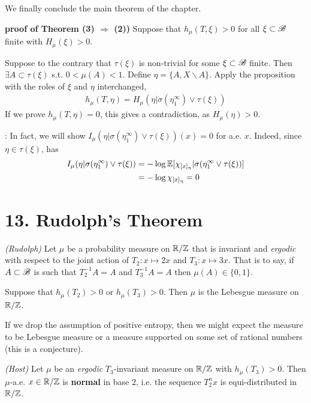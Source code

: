\documentclass[12pt,a4paper]{report}
\newenvironment{proof}
{\begin{changemargin}{1cm}{0.5cm} 
	}%
	{\end{changemargin}
}
\newenvironment{subproof}
{\begin{changemargin}{0.5cm}{0.5cm}
	}%
	{\end{changemargin}
}
\begin{document}
We finally conclude the main theorem of the chapter.
\s

\begin{proof}
\textbf{proof of Theorem (3) $\Rightarrow$ (2))} Suppose that $h_{\mu}(T, \xi ) >0$ for all $\xi \subset \mathscr{B}$ finite with $H_{\mu}(\xi) >0$. 

\quad Suppose to the contrary that $\tau(\xi)$ is non-trivial for some $\xi \subset \mathscr{B}$ finite. Then $\exists A \subset \tau(\xi)$ s.t. $0< \mu(A) <1$. Define $\eta = \{A, X\backslash A \}$. Apply the proposition with the roles of $\xi$ and $\eta$ interchanged,
\begin{align*}
h_{\mu}(T, \eta) = H_{\mu} (\eta | \sigma(\eta_1^{\infty}) \vee \tau(\xi) ) 
\end{align*}
If we prove $h_{\mu}(T, \eta) =0$, this gives a contradiction, as $H_{\mu}(\eta) >0$.
\begin{subproof}
: In fact, we will show $I_{\mu}(\eta | \sigma(\eta_1^{\infty}) \vee \tau(\xi)) (x) =0$ for a.e. $x$. Indeed, since $\eta \in \tau(\xi)$, has
\begin{align*}
I_{\mu}(\eta | \sigma(\eta_1^{\infty}) \vee \tau(\xi)) &= -\log \mathbb{E} [\chi_{[x]_{\eta}} | \sigma(\eta_1^{\infty} \vee \tau(\xi))] \\
&= -\log \chi_{[x]_{\eta}} =0
\end{align*}
\end{subproof}
\eop
\end{proof}

\section*{13. Rudolph's Theorem}

\thm \emph{(Rudolph)} Let $\mu$ be a probability measure on $\mathbb{R}/ \mathbb{Z}$ that is invariant and \emph{ergodic} with respect to the joint action of $T_2 : x \mapsto 2x$ and $T_3 : x\mapsto 3x$. That is to say, if $A \subset \mathscr{B}$ is such that $T_2^{-1} A =A$ and $T_3^{-1} A =A$ then $\mu(A) \in \{0,1\}$. 

\quad Suppose that $h_{\mu}(T_2)>0$ or $h_{\mu}(T_3) >0$. Then $\mu$ is the Lebesgue measure on $\mathbb{R}/\mathbb{Z}$.
\s

If we drop the assumption of positive entropy, then we might expect the measure to be Lebesgue measure or a measure supported on some set of rational numbers (this is a conjecture).
\s

\thm \emph{(Host)} Let $\mu$ be an \emph{ergodic} $T_3$-invariant measure on $\mathbb{R}/\mathbb{Z}$ with $h_{\mu}(T_3)>0$. Then $\mu$-a.e. $x\in \mathbb{R}/\mathbb{Z}$ is \textbf{normal} in base 2, i.e. the sequence $T_2^n x$ is equi-distributed in $\mathbb{R}/ \mathbb{Z}$.
\end{document}
